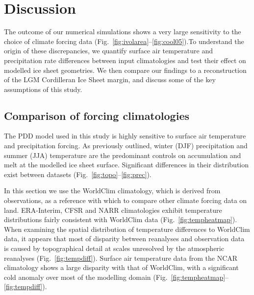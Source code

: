 \section{Discussion}
\label{sec:discussion}

The outcome of our numerical simulations shows a very large sensitivity to the choice of climate forcing data (Fig.~\ref{fig:ivolarea}--\ref{fig:cool05}).To understand the origin of these discrepancies, we quantify surface air temperature and precipitation rate differences between input climatologies and test their effect on modelled ice sheet geometries. We then compare our findings to a reconstruction of the LGM Cordilleran Ice Sheet margin, and discuss some of the key assumptions of this study.

\subsection{Comparison of forcing climatologies}

The PDD model used in this study is highly sensitive to surface air temperature and precipitation forcing. As previously outlined, winter (DJF) precipitation and summer (JJA) temperature are the predominant controls on accumulation and melt at the modelled ice sheet surface. Significant differences in their distribution exist between datasets (Fig.~\ref{fig:topo}--\ref{fig:prec}).

In this section we use the WorldClim climatology, which is derived from observations, as a reference with which to compare other climate forcing data on land. ERA-Interim, CFSR and NARR climatologies exhibit temperature distributions fairly consistent with WorldClim data (Fig.~\ref{fig:tempheatmap}). When examining the spatial distribution of temperature differences to WorldClim data, it appears that most of disparity between reanalyses and observation data is caused by topographical detail at scales unresolved by the atmospheric reanalyses (Fig.~\ref{fig:tempdiff}). Surface air temperature data from the NCAR climatology shows a large disparity with that of WorldClim, with a significant cold anomaly over most of the modelling domain (Fig.~\ref{fig:tempheatmap}--\ref{fig:tempdiff}).

